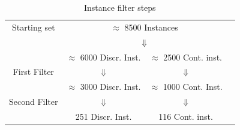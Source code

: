 \begin{center}
\begin{table}[]
 \centering

 \setlength{\tabcolsep}{5pt}
\begin{tabular}{cccc}
Starting set& \multicolumn{ 2}{c}{ $\approx$ 8500 Instances }& \\
& \multicolumn{ 2}{c}{$\Downarrow$}& \\
& $\approx$ 6000 Discr. Inst.  & $\approx$ 2500 Cont. inst. & \\
First Filter  & $\Downarrow$  & $\Downarrow$ & \\
 & $\approx$ 3000 Discr. Inst.  & $\approx$ 1000 Cont. Inst. & \\
Second Filter & $\Downarrow$  & $\Downarrow$  & \\
  & 251 Discr. Inst.  & 116  Cont. inst. & \\
\end{tabular}
\caption{Instance filter steps} \label{tab:filters}
\end{table}
\end{center}


